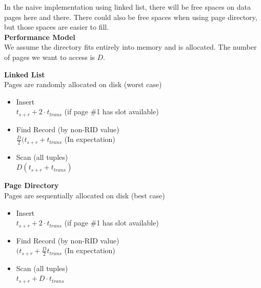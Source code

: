 \vspace{.2cm}
In the naive implementation using linked list, there will be free spaces on data pages here and there. There could also be free spaces when using page directory, but those spaces are easier to fill. \vspace{.3cm}\\
\textbf{Performance Model}\\
We assume the directory fits entirely into memory and is allocated. The number of pages we want to access is $D$.\vspace{.15cm}\\
\begin{tcolorbox}
\begin{minipage}[t]{.48\textwidth}
\textbf{Linked List}\\
Pages are randomly allocated on disk (worst case)
\begin{itemize}
\item Insert\\
$t_{s+r} + 2 \cdot t_{trans}$ (if page \#1 has slot available)
\item Find Record (by non-RID value)\\
$\frac{D}{2}(t_{s+r} + t_{trans}$ (In expectation)
\item Scan (all tuples)\\
$D(t_{s+r} + t_{trans})$
\end{itemize}
\end{minipage}
\begin{minipage}{.04\textwidth}
\hfill
\end{minipage}
\begin{minipage}[t]{.48\textwidth}
\textbf{Page Directory}\\
Pages are sequentially allocated on disk (best case)
\begin{itemize}
\item Insert\\
$t_{s+r} + 2 \cdot t_{trans}$ (if page \#1 has slot available)
\item Find Record (by non-RID value)\\
$(t_{s+r} + \frac{D}{2}t_{trans}$ (In expectation)
\item Scan (all tuples)\\
$t_{s+r} + D\cdot t_{trans}$
\end{itemize}
\end{minipage}
\end{tcolorbox}

